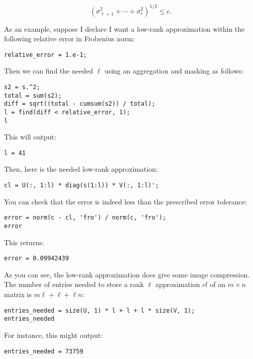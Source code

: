 \documentclass{ximera}
\begin{document}
\[
\left( \sigma_{\ell+1}^2 + \cdots + \sigma_{r}^2 \right)^{1/2} \leq \epsilon.
\]

As an example, suppose I declare I want a low-rank approximation within the following relative error in Frobenius norm:

\begin{verbatim}
relative_error = 1.e-1;
\end{verbatim}

Then we can find the needed \( \ell \) using an aggregation and masking as follows:

\begin{verbatim}
s2 = s.^2;
total = sum(s2);
diff = sqrt((total - cumsum(s2)) / total);
l = find(diff < relative_error, 1);
l
\end{verbatim}

This will output:

\begin{verbatim}
l = 41
\end{verbatim}

Then, here is the needed low-rank approximation:

\begin{verbatim}
cl = U(:, 1:l) * diag(s(1:l)) * V(:, 1:l)';
\end{verbatim}

You can check that the error is indeed less than the prescribed error tolerance:

\begin{verbatim}
error = norm(c - cl, 'fro') / norm(c, 'fro');
error
\end{verbatim}

This returns:

\begin{verbatim}
error = 0.09942439
\end{verbatim}

As you can see, the low-rank approximation does give some image compression. The number of entries needed to store a rank \( \ell \) approximation \( cl \) of an \( m \times n \) matrix is \( m\ell + \ell + \ell n \):

\begin{verbatim}
entries_needed = size(U, 1) * l + l + l * size(V, 1);
entries_needed
\end{verbatim}

For instance, this might output:

\begin{verbatim}
entries_needed = 73759
\end{verbatim}
\end{document}
